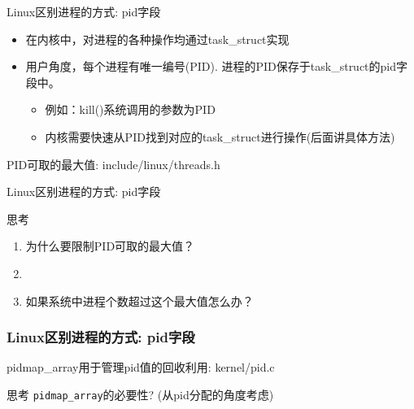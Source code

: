 \documentclass[xcolor=svgnames]{beamer}
\begin{document}
\begin{CJK*}{UTF8}{gbsn}
\begin{frame}{Linux区别进程的方式: pid字段}
\begin{itemize}
\item 在内核中，对进程的各种操作均通过task\_struct实现
\item 用户角度，每个进程有唯一编号(PID). 进程的PID保存于task\_struct的pid字段中。
\begin{itemize}
\item 例如：kill()系统调用的参数为PID
\item 内核需要快速从PID找到对应的task\_struct进行操作(后面讲具体方法)
\end{itemize}
\end{itemize}
\begin{block}{PID可取的最大值: include/linux/threads.h}
\lstpidmax
\end{block}
\end{frame}

\begin{frame}{Linux区别进程的方式: pid字段}
\begin{block}{思考}
\begin{enumerate}
\item 为什么要限制PID可取的最大值？
\item[]
\item 如果系统中进程个数超过这个最大值怎么办？
\end{enumerate}
\end{block}
\end{frame}

\begin{frame}[fragile]
\frametitle{Linux区别进程的方式: pid字段}
\begin{block}{pidmap\_array用于管理pid值的回收利用: kernel/pid.c}
\lstpidmaparray
\end{block}
\begin{block}{思考}
\verb|pidmap_array|的必要性? (从pid分配的角度考虑)
\end{block}
\end{frame}


\end{CJK*}
\end{document}
